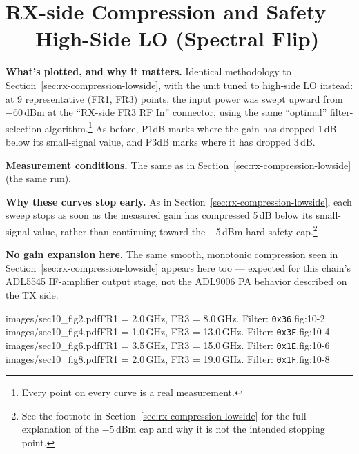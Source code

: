 \clearpage
\section{RX-side Compression and Safety --- High-Side LO (Spectral Flip)}
\label{sec:rx-compression-highside}

\textbf{What's plotted, and why it matters.} Identical methodology to
Section~\ref{sec:rx-compression-lowside}, with the unit tuned to high-side LO instead: at 9 representative
(FR1, FR3) points, the input power was swept upward from −60\,dBm at the ``RX-side FR3 RF In'' connector, using
the same ``optimal'' filter-selection algorithm.\footnote{Every point on every curve is a real measurement.} As before, P1dB marks where the gain has dropped 1\,dB below its
small-signal value, and P3dB marks where it has dropped 3\,dB.

\textbf{Measurement conditions.} The same as in Section~\ref{sec:rx-compression-lowside} (the same run).

\textbf{Why these curves stop early.} As in Section~\ref{sec:rx-compression-lowside}, each sweep stops as soon
as the measured gain has compressed 5\,dB below its small-signal value, rather than continuing toward the
−5\,dBm hard safety cap.\footnote{See the footnote in Section~\ref{sec:rx-compression-lowside} for the full
explanation of the −5\,dBm cap and why it is not the intended stopping point.}

\textbf{No gain expansion here.} The same smooth, monotonic compression seen in
Section~\ref{sec:rx-compression-lowside} appears here too --- expected for this chain's ADL5545 IF-amplifier
output stage, not the ADL9006 PA behavior described on the TX side.

%
        {images/sec10_fig2.pdf}{FR1 = 2.0\,GHz, FR3 = 8.0\,GHz. Filter: \texttt{0x36}.}{fig:10-2}
%
        {images/sec10_fig4.pdf}{FR1 = 1.0\,GHz, FR3 = 13.0\,GHz. Filter: \texttt{0x3F}.}{fig:10-4}
%
        {images/sec10_fig6.pdf}{FR1 = 3.5\,GHz, FR3 = 15.0\,GHz. Filter: \texttt{0x1E}.}{fig:10-6}
%
        {images/sec10_fig8.pdf}{FR1 = 2.0\,GHz, FR3 = 19.0\,GHz. Filter: \texttt{0x1F}.}{fig:10-8}
